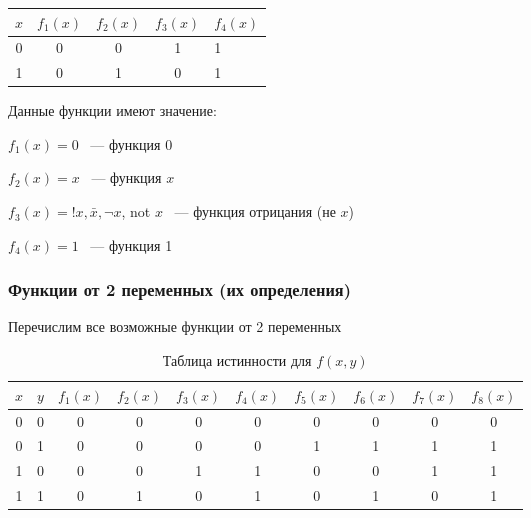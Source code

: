 \documentclass[russian]{lecture-notes}
\begin{document}
\begin{sloppypar}
\begin{example}
            \begin{table}[h!]
                \centering
                \begin{tabular}{|c|c|c|c|l|}
                    \hline
                    $x$ & $f_1(x)$ & $f_2(x)$ & $f_3(x)$ & $f_4(x)$ \\ \hline
                    0      & 0        & 0        & 1        & 1        \\ \hline
                    1      & 0        & 1        & 0        & 1        \\ \hline
                \end{tabular}
            \end{table}

            Данные функции имеют значение:

            $f_1(x) = 0$ ~--- функция 0

            $f_2(x) = x$ ~--- функция $x$

            $f_3(x) = !x, \bar x, \neg x$, not $x$ ~--- функция отрицания (не $x$)

            $f_4(x) = 1$ ~--- функция 1

        \end{example}

        \subsubsection{Функции от 2 переменных (их определения)}

        \begin{example}
            Перечислим все возможные функции от 2 переменных

            \begin{table}[h!]
                \centering
                \begin{tabular}{|c|c|c|c|c|c|c|c|c|c|}
                    \hline
                    $x$ & $y$ & $f_1(x)$ & $f_2(x)$ & $f_3(x)$ & $f_4(x)$ & $f_5(x)$ & $f_6(x)$ & $f_7(x)$ & $f_8(x)$ \\ \hline
                    0      & 0   & 0        & 0        & 0        & 0        & 0        & 0        & 0        & 0        \\ \hline
                    0      & 1   & 0        & 0        & 0        & 0        & 1        & 1        & 1        & 1        \\ \hline
                    1      & 0   & 0        & 0        & 1        & 1        & 0        & 0        & 1        & 1        \\ \hline
                    1      & 1   & 0        & 1        & 0        & 1        & 0        & 1        & 0        & 1        \\ \hline
                \end{tabular}
                \caption{Таблица истинности для $f(x,y)$}
            \end{table}


\end{example}
\end{sloppypar}
\end{document}
